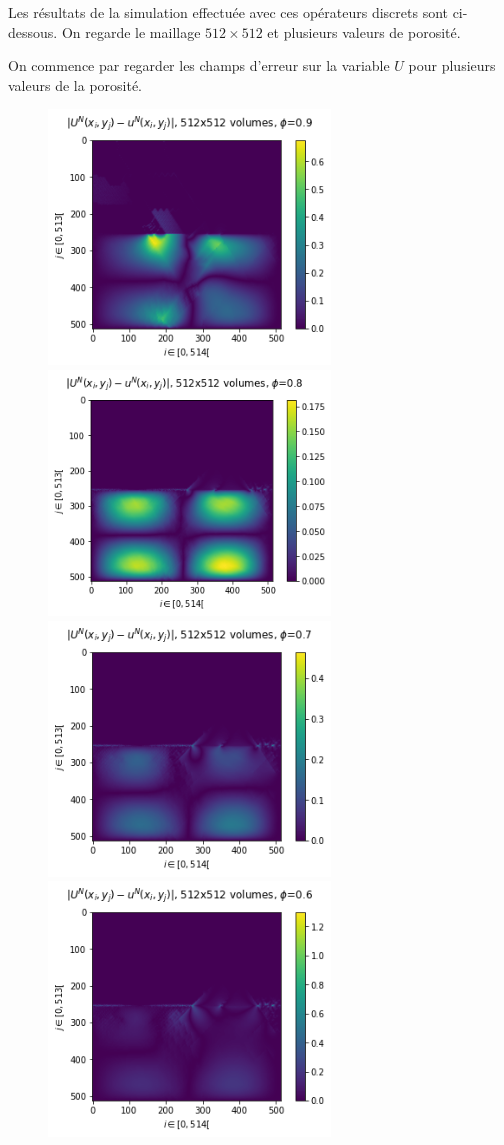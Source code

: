 Les résultats de la simulation effectuée avec ces opérateurs discrets sont ci-dessous. On regarde le maillage $512 \times 512$ et plusieurs valeurs de porosité.

On commence par regarder les champs d'erreur sur la variable $U$ pour plusieurs valeurs de la porosité. 
\begin{figure}[htp]
    \centering
    \includegraphics[width=7.5cm]{Images/bicouche/0.9/Figure 2021-11-18 231238 (57).png}
    \includegraphics[width=7.5cm]{Images/bicouche/0.8/Figure 2021-11-18 231238 (49).png}
    \includegraphics[width=7.5cm]{Images/bicouche/0.7/Figure 2021-11-18 231238 (41).png}
    \includegraphics[width=7.5cm]{Images/bicouche/0.6/Figure 2021-11-18 231238 (33).png}

\end{figure}
